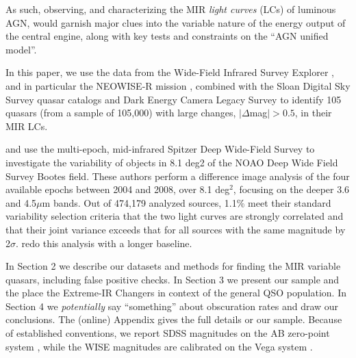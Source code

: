 \documentclass{emulateapj}
\begin{document}
As such, observing, and characterizing the MIR {\it light curves} (LCs) of
luminous AGN, would garnish major clues into the variable nature of
the energy output of the central engine, along with key tests and
constraints on the ``AGN unified model''.

In this paper, we use the data from the Wide-Field
Infrared Survey Explorer \citep[WISE; ][]{Wright10}, and in particular
the NEOWISE-R mission \citep{Mainzer14, Meisner16}, combined with the
Sloan Digital Sky Survey quasar catalogs \citep[DR7Q; ][]{Schneider10}
and Dark Energy Camera Legacy Survey \citep[DECaLS; ][]{Lang16} to
identify 105 quasars (from a sample of 105,000) with large changes,
$|\Delta$mag$|>0.5$, in their MIR LCs. 

\citet{Kozlowski2010} and use the multi-epoch, mid-infrared Spitzer
Deep Wide-Field Survey to investigate the variability of objects in
8.1 deg2 of the NOAO Deep Wide Field Survey Bootes field.  These
authors perform a difference image analysis of the four available
epochs between 2004 and 2008, over 8.1 deg$^2$, focusing on the deeper
3.6 and 4.5$\mu$m bands. Out of 474,179 analyzed sources, 1.1\% meet
their standard variability selection criteria that the two light
curves are strongly correlated and that their joint variance exceeds
that for all sources with the same magnitude by 2$\sigma$.
\citet{Kozlowski2016} redo this analysis with a longer baseline.

In Section 2 we describe our datasets and methods for finding the MIR
variable quasars, including false positive checks. In Section 3 we
present our sample and the place the Extreme-IR Changers in context of
the general QSO population. In Section 4 we {\it potentially} say
``something'' about obscuration rates and draw our conclusions. 
The (online) Appendix gives the full details or our sample. 
Because of established conventions, we report SDSS magnitudes on the
AB zero-point system \citep{Oke83, Fukugita96}, while the WISE
magnitudes are calibrated on the Vega system \citep{Wright10}.



\end{document}
